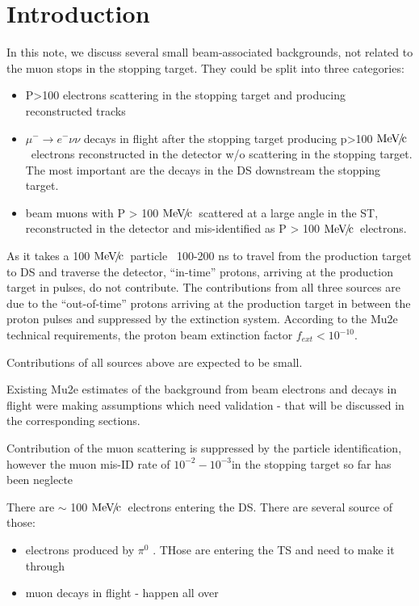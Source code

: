 \documentclass[12pt]{article}
\newcommand {\MeVc}       {\mbox{$\rm MeV\!/\!c$}}
\newcommand {\ra}        {\rightarrow}
\begin{document}
\section {Introduction}

In this note, we discuss several small beam-associated backgrounds, not related to
the muon stops in the stopping target. They could be split into three categories:

\begin{itemize}
\item 
  P>100 electrons scattering in the stopping target and producing reconstructed tracks
\item
  $\mu^- \ra e^- \nu \nu$ decays in flight after the stopping target producing p>100 \MeVc\
  electrons reconstructed in the detector w/o scattering in the stopping target.
  The most important are the decays in the DS downstream the stopping target.
\item
  beam muons with P > 100 \MeVc\ scattered at a large angle in the ST,
  reconstructed in the detector and mis-identified as P > 100 \MeVc\ electrons.
\end{itemize}

As it takes a 100 \MeVc\ particle ~100-200 ns to travel from the production target to DS and
traverse the detector, ``in-time'' protons, arriving at the production target in pulses, 
do not contribute. The contributions from all three sources are due to the ``out-of-time''
protons arriving at the production target in between the proton pulses and suppressed by the
extinction system. According to the Mu2e technical requirements, the proton beam extinction
factor $f_{ext} < 10^{-10}$.

Contributions of all sources above are expected to be small.

Existing Mu2e estimates of the background from beam electrons and decays in flight
were making assumptions which need validation - that will be discussed in the corresponding sections.

Contribution of the muon scattering is suppressed by the particle identification, however the
muon mis-ID rate of $10^{-2} - 10^{-3} $in the stopping target so far has been neglecte

There are $\sim$ 100 \MeVc\ electrons entering the DS. There are several source of those:
\begin{itemize}
\item
  electrons produced by $\pi^0$ . THose are entering the TS and need to make it through
\item
  muon decays in flight - happen all over
\end{itemize}
\end{document}
